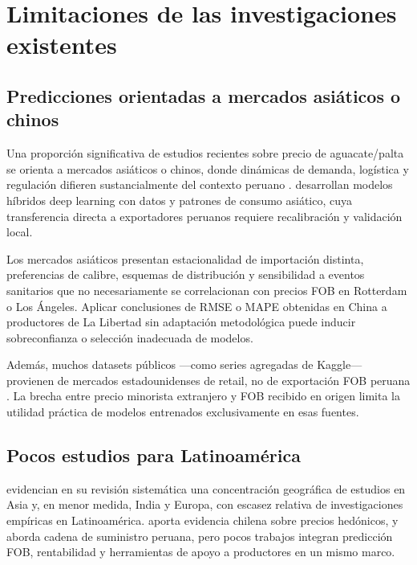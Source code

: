 \section{Limitaciones de las investigaciones existentes}

\subsection{Predicciones orientadas a mercados asi\'aticos o chinos}

Una proporci\'on significativa de estudios recientes sobre precio de aguacate/palta se orienta a mercados asi\'aticos o chinos, donde din\'amicas de demanda, log\'istica y regulaci\'on difieren sustancialmente del contexto peruano \citep{Zhang2025, Theofilou2025}. \citet{Zhang2025} desarrollan modelos h\'ibridos deep learning con datos y patrones de consumo asi\'atico, cuya transferencia directa a exportadores peruanos requiere recalibraci\'on y validaci\'on local.

Los mercados asi\'aticos presentan estacionalidad de importaci\'on distinta, preferencias de calibre, esquemas de distribuci\'on y sensibilidad a eventos sanitarios que no necesariamente se correlacionan con precios FOB en Rotterdam o Los \'Angeles. Aplicar conclusiones de RMSE o MAPE obtenidas en China a productores de La Libertad sin adaptaci\'on metodol\'ogica puede inducir sobreconfianza o selecci\'on inadecuada de modelos.

Adem\'as, muchos datasets p\'ublicos ---como series agregadas de Kaggle--- provienen de mercados estadounidenses de retail, no de exportaci\'on FOB peruana \citep{KaggleAvocado}. La brecha entre precio minorista extranjero y FOB recibido en origen limita la utilidad pr\'actica de modelos entrenados exclusivamente en esas fuentes.

\subsection{Pocos estudios para Latinoam\'erica}

\citet{Theofilou2025} evidencian en su revisi\'on sistem\'atica una concentraci\'on geogr\'afica de estudios en Asia y, en menor medida, India y Europa, con escasez relativa de investigaciones emp\'iricas en Latinoam\'erica. \citet{Trincado2022} aporta evidencia chilena sobre precios hed\'onicos, y \citet{Torres2022} aborda cadena de suministro peruana, pero pocos trabajos integran predicci\'on FOB, rentabilidad y herramientas de apoyo a productores en un mismo marco.

